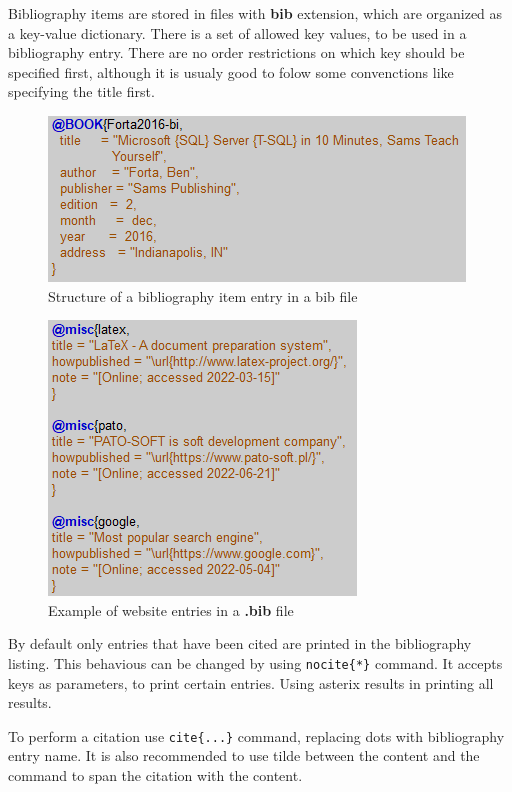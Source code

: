 Bibliography items are stored in files with \textbf{\gls{bib}} extension, which are organized as a key-value dictionary. There is a set of allowed key values, to be used in a bibliography entry. There are no order restrictions on which key should be specified first, although it is usualy good to folow some convenctions like specifying the title first.

\begin{figure}[H]
\centering
\includegraphics[scale=0.9]{content/LaTeX/figures/biblio_example.png}
\caption{Structure of a bibliography item entry in a \gls{bib} file}
\label{fig:biblio_example}
\end{figure}

\begin{figure}[H]
\centering
\includegraphics[scale=0.9]{content/LaTeX/figures/biblio_bib.png}
\caption{Example of website entries in a \textbf{.bib} file}
\label{fig:biblio_websites}
\end{figure}

By default only entries that have been cited are printed in the bibliography listing. This behavious can be changed by using \texttt{\bs nocite\{*\}} command. It accepts keys as parameters, to print certain entries. Using asterix results in printing all results.

To perform a citation use \texttt{\bs cite\{...\}} command, replacing dots with bibliography entry name. It is also recommended to use tilde between the content and the command to span the citation with the content.


